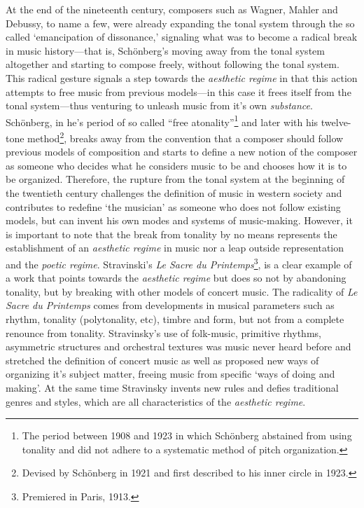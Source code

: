 At the end of the nineteenth century, composers such as Wagner, Mahler and Debussy, to name a few, were already expanding the tonal system through the so called `emancipation of dissonance,' signaling what was to become a radical break in music history---that is, Sch\"{o}nberg's moving away from the tonal system altogether and starting to compose freely, without following the tonal system. This radical gesture signals a step towards the \emph{aesthetic regime} in that this action attempts to free music from previous models---in this case it frees itself from the tonal system---thus venturing to unleash music from it's own \emph{substance}. Sch\"{o}nberg, in he's period of so called ``free atonality''\footnote{The period between 1908 and 1923 in which Sch\"{o}nberg abstained from using tonality and did not adhere to a systematic method of pitch organization.} and later with his twelve-tone method\footnote{Devised by Sch\"{o}nberg in 1921 and first described to his inner circle in 1923.}, breaks away from the convention that a composer should follow previous models of composition and starts to define a new notion of the composer as someone who decides what he considers music to be and chooses how it is to be organized. Therefore, the rupture from the tonal system at the beginning of the twentieth century challenges the definition of music in western society and contributes to redefine `the musician' as someone who does not follow existing models, but can invent his own modes and systems of music-making. However, it is important to note that the break from tonality by no means represents the establishment of an \emph{aesthetic regime} in music nor a leap outside representation and the \emph{poetic regime}.  Stravinski's \emph{Le Sacre du Printemps}\footnote{Premiered in Paris, 1913.}, is a clear example of a work that points towards the \emph{aesthetic regime} but does so not by abandoning tonality, but by breaking with other models of concert music. The radicality of \emph{Le Sacre du Printemps} comes from developments in musical parameters such as rhythm, tonality (polytonality, etc), timbre and form, but not from a complete renounce from tonality. Stravinsky's use of folk-music, primitive rhythms, asymmetric structures and orchestral textures was music never heard before and stretched the definition of concert music as well as proposed new ways of organizing it's subject matter, freeing music from specific `ways of doing and making'. At the same time Stravinsky invents new rules and defies traditional genres and styles, which are all characteristics of the \emph{aesthetic regime}. 

